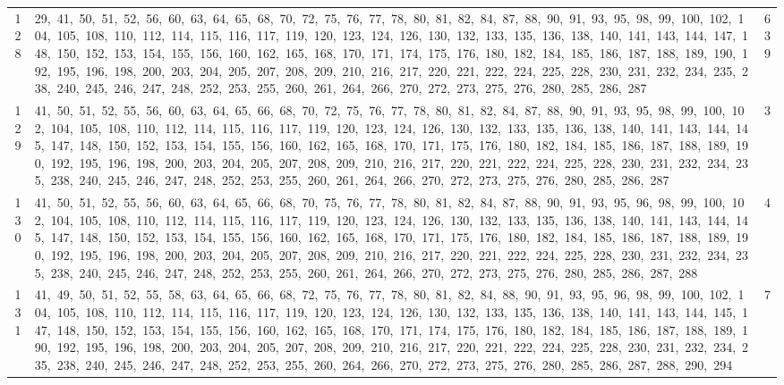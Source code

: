 \begin{longtable}{c|p{}|r}
128 & 29,\ 41,\ 50,\ 51,\ 52,\ 56,\ 60,\ 63,\ 64,\ 65,\ 68,\ 70,\ 72,\ 75,\ 76,\ 77,\ 78,\ 80,\ 81,\ 82,\ 84,\ 87,\ 88,\ 90,\ 91,\ 93,\ 95,\ 98,\ 99,\ 100,\ 102,\ 104,\ 105,\ 108,\ 110,\ 112,\ 114,\ 115,\ 116,\ 117,\ 119,\ 120,\ 123,\ 124,\ 126,\ 130,\ 132,\ 133,\ 135,\ 136,\ 138,\ 140,\ 141,\ 143,\ 144,\ 147,\ 148,\ 150,\ 152,\ 153,\ 154,\ 155,\ 156,\ 160,\ 162,\ 165,\ 168,\ 170,\ 171,\ 174,\ 175,\ 176,\ 180,\ 182,\ 184,\ 185,\ 186,\ 187,\ 188,\ 189,\ 190,\ 192,\ 195,\ 196,\ 198,\ 200,\ 203,\ 204,\ 205,\ 207,\ 208,\ 209,\ 210,\ 216,\ 217,\ 220,\ 221,\ 222,\ 224,\ 225,\ 228,\ 230,\ 231,\ 232,\ 234,\ 235,\ 238,\ 240,\ 245,\ 246,\ 247,\ 248,\ 252,\ 253,\ 255,\ 260,\ 261,\ 264,\ 266,\ 270,\ 272,\ 273,\ 275,\ 276,\ 280,\ 285,\ 286,\ 287 & 639 \\
129 & 41,\ 50,\ 51,\ 52,\ 55,\ 56,\ 60,\ 63,\ 64,\ 65,\ 66,\ 68,\ 70,\ 72,\ 75,\ 76,\ 77,\ 78,\ 80,\ 81,\ 82,\ 84,\ 87,\ 88,\ 90,\ 91,\ 93,\ 95,\ 98,\ 99,\ 100,\ 102,\ 104,\ 105,\ 108,\ 110,\ 112,\ 114,\ 115,\ 116,\ 117,\ 119,\ 120,\ 123,\ 124,\ 126,\ 130,\ 132,\ 133,\ 135,\ 136,\ 138,\ 140,\ 141,\ 143,\ 144,\ 145,\ 147,\ 148,\ 150,\ 152,\ 153,\ 154,\ 155,\ 156,\ 160,\ 162,\ 165,\ 168,\ 170,\ 171,\ 175,\ 176,\ 180,\ 182,\ 184,\ 185,\ 186,\ 187,\ 188,\ 189,\ 190,\ 192,\ 195,\ 196,\ 198,\ 200,\ 203,\ 204,\ 205,\ 207,\ 208,\ 209,\ 210,\ 216,\ 217,\ 220,\ 221,\ 222,\ 224,\ 225,\ 228,\ 230,\ 231,\ 232,\ 234,\ 235,\ 238,\ 240,\ 245,\ 246,\ 247,\ 248,\ 252,\ 253,\ 255,\ 260,\ 261,\ 264,\ 266,\ 270,\ 272,\ 273,\ 275,\ 276,\ 280,\ 285,\ 286,\ 287 & 3 \\
130 & 41,\ 50,\ 51,\ 52,\ 55,\ 56,\ 60,\ 63,\ 64,\ 65,\ 66,\ 68,\ 70,\ 75,\ 76,\ 77,\ 78,\ 80,\ 81,\ 82,\ 84,\ 87,\ 88,\ 90,\ 91,\ 93,\ 95,\ 96,\ 98,\ 99,\ 100,\ 102,\ 104,\ 105,\ 108,\ 110,\ 112,\ 114,\ 115,\ 116,\ 117,\ 119,\ 120,\ 123,\ 124,\ 126,\ 130,\ 132,\ 133,\ 135,\ 136,\ 138,\ 140,\ 141,\ 143,\ 144,\ 145,\ 147,\ 148,\ 150,\ 152,\ 153,\ 154,\ 155,\ 156,\ 160,\ 162,\ 165,\ 168,\ 170,\ 171,\ 175,\ 176,\ 180,\ 182,\ 184,\ 185,\ 186,\ 187,\ 188,\ 189,\ 190,\ 192,\ 195,\ 196,\ 198,\ 200,\ 203,\ 204,\ 205,\ 207,\ 208,\ 209,\ 210,\ 216,\ 217,\ 220,\ 221,\ 222,\ 224,\ 225,\ 228,\ 230,\ 231,\ 232,\ 234,\ 235,\ 238,\ 240,\ 245,\ 246,\ 247,\ 248,\ 252,\ 253,\ 255,\ 260,\ 261,\ 264,\ 266,\ 270,\ 272,\ 273,\ 275,\ 276,\ 280,\ 285,\ 286,\ 287,\ 288 & 4 \\
131 & 41,\ 49,\ 50,\ 51,\ 52,\ 55,\ 58,\ 63,\ 64,\ 65,\ 66,\ 68,\ 72,\ 75,\ 76,\ 77,\ 78,\ 80,\ 81,\ 82,\ 84,\ 88,\ 90,\ 91,\ 93,\ 95,\ 96,\ 98,\ 99,\ 100,\ 102,\ 104,\ 105,\ 108,\ 110,\ 112,\ 114,\ 115,\ 116,\ 117,\ 119,\ 120,\ 123,\ 124,\ 126,\ 130,\ 132,\ 133,\ 135,\ 136,\ 138,\ 140,\ 141,\ 143,\ 144,\ 145,\ 147,\ 148,\ 150,\ 152,\ 153,\ 154,\ 155,\ 156,\ 160,\ 162,\ 165,\ 168,\ 170,\ 171,\ 174,\ 175,\ 176,\ 180,\ 182,\ 184,\ 185,\ 186,\ 187,\ 188,\ 189,\ 190,\ 192,\ 195,\ 196,\ 198,\ 200,\ 203,\ 204,\ 205,\ 207,\ 208,\ 209,\ 210,\ 216,\ 217,\ 220,\ 221,\ 222,\ 224,\ 225,\ 228,\ 230,\ 231,\ 232,\ 234,\ 235,\ 238,\ 240,\ 245,\ 246,\ 247,\ 248,\ 252,\ 253,\ 255,\ 260,\ 264,\ 266,\ 270,\ 272,\ 273,\ 275,\ 276,\ 280,\ 285,\ 286,\ 287,\ 288,\ 290,\ 294 & 7 \\

\end{longtable}
